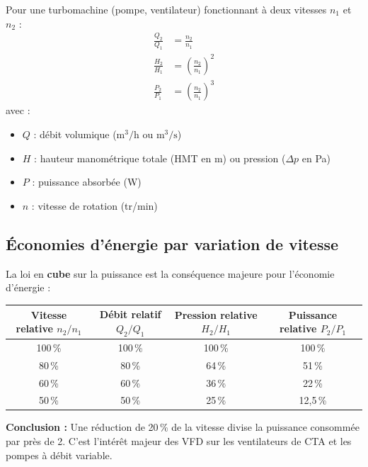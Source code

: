 \begin{definition}
  Pour une turbomachine (pompe, ventilateur) fonctionnant à deux vitesses $n_1$ et $n_2$ :
  \begin{align}
    \frac{Q_2}{Q_1} &= \frac{n_2}{n_1} \label{eq:loi1} \tag{Débit} \\[6pt]
    \frac{H_2}{H_1} &= \left(\frac{n_2}{n_1}\right)^2 \label{eq:loi2} \tag{HMT / pression} \\[6pt]
    \frac{P_2}{P_1} &= \left(\frac{n_2}{n_1}\right)^3 \label{eq:loi3} \tag{Puissance absorbée}
  \end{align}
  avec :
  \begin{itemize}
    \item $Q$ : débit volumique ($\text{m}^3/\text{h}$ ou $\text{m}^3/\text{s}$)
    \item $H$ : hauteur manométrique totale (HMT en m) ou pression ($\Delta p$ en Pa)
    \item $P$ : puissance absorbée (W)
    \item $n$ : vitesse de rotation (tr/min)
  \end{itemize}
\end{definition}

\subsection{Économies d'énergie par variation de vitesse}

La loi en \textbf{cube} sur la puissance est la conséquence majeure pour l'économie d'énergie :

\begin{center}
  \begin{tabular}{cccc}
    \toprule
    Vitesse relative $n_2/n_1$ & Débit relatif $Q_2/Q_1$ & Pression relative $H_2/H_1$ & Puissance relative $P_2/P_1$ \\
    \midrule
    100\,\% & 100\,\% & 100\,\% & 100\,\% \\
    80\,\%  & 80\,\%  & 64\,\%  & 51\,\% \\
    60\,\%  & 60\,\%  & 36\,\%  & 22\,\% \\
    50\,\%  & 50\,\%  & 25\,\%  & 12{,}5\,\% \\
    \bottomrule
  \end{tabular}
\end{center}

\textbf{Conclusion :} Une réduction de 20\,\% de la vitesse divise la puissance consommée par près de 2. C'est l'intérêt majeur des VFD sur les ventilateurs de CTA et les pompes à débit variable.

